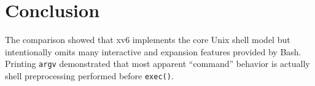 \documentclass[12pt,a4paper]{article}
\begin{document}
\section{Conclusion}
The comparison showed that xv6 implements the core Unix shell model but intentionally omits many interactive and expansion features provided by Bash. Printing \texttt{argv} demonstrated that most apparent ``command'' behavior is actually shell preprocessing performed before \texttt{exec()}.
\end{document}
